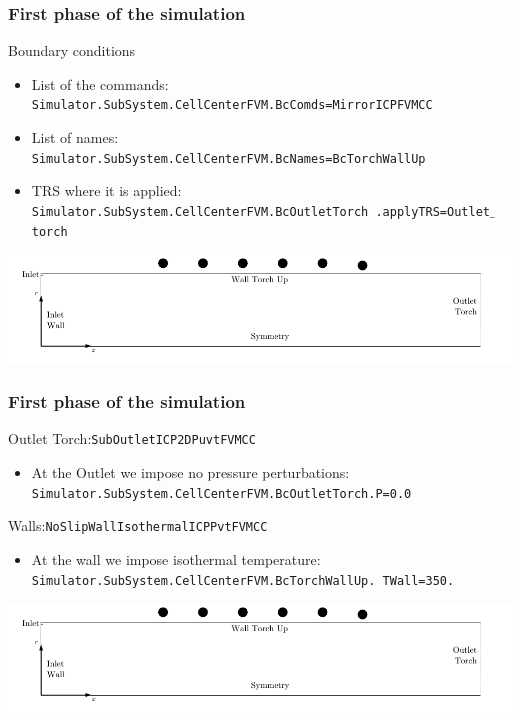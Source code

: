 \documentclass[compress,10pt]{beamer}
\begin{document}
\begin{frame}
\frametitle{First phase of the simulation}
\begin{block}{Boundary conditions}
\begin{itemize}
 \item List of the commands:\\
\hspace*{-0.5cm} \texttt{\small{Simulator.SubSystem.CellCenterFVM.BcComds=MirrorICPFVMCC}}
 \item List of names:\\
\hspace*{-0.5cm}  \texttt{\small{Simulator.SubSystem.CellCenterFVM.BcNames=BcTorchWallUp}}
 \item TRS where it is applied:
\hspace*{-0.5cm}  \texttt{\small{Simulator.SubSystem.CellCenterFVM.BcOutletTorch
  \hspace*{6cm}.applyTRS=Outlet$\_$torch}}
\end{itemize}
\end{block}
 \includegraphics[width=\textwidth]{geom_torch.pdf}
\end{frame}




\begin{frame}
\frametitle{First phase of the simulation}
\begin{block}{Outlet Torch:\texttt{SubOutletICP2DPuvtFVMCC}}
\begin{itemize}
\item At the Outlet we impose no pressure perturbations:\\
  \texttt{\small{Simulator.SubSystem.CellCenterFVM.BcOutletTorch.P=0.0}}
\end{itemize}
\end{block}
\begin{block}{Walls:\texttt{NoSlipWallIsothermalICPPvtFVMCC}}
\begin{itemize}
\item At the wall we impose isothermal temperature:\\
  \texttt{\small{Simulator.SubSystem.CellCenterFVM.BcTorchWallUp.
\hspace*{6cm}TWall=350.}}
\end{itemize}
\end{block}
 \includegraphics[width=\textwidth]{geom_torch.pdf}
\end{frame}
\end{document}
